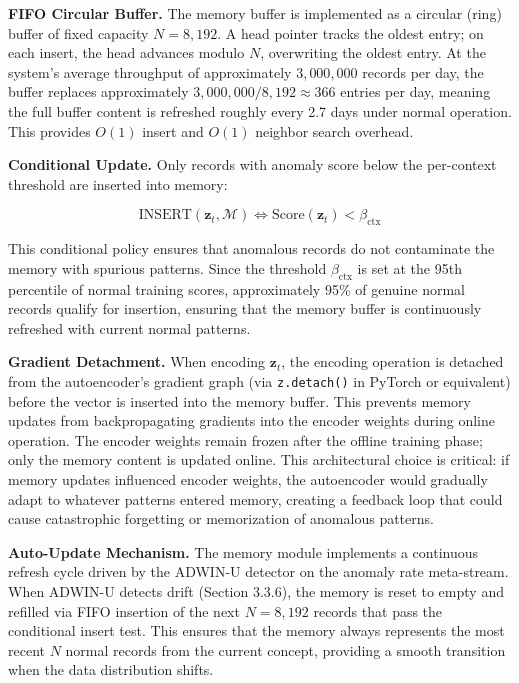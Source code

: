 \textbf{FIFO Circular Buffer.} The memory buffer is implemented as a circular (ring) buffer of fixed capacity $N = 8{,}192$. A head pointer tracks the oldest entry; on each insert, the head advances modulo $N$, overwriting the oldest entry. At the system's average throughput of approximately $3{,}000{,}000$ records per day, the buffer replaces approximately $3{,}000{,}000 / 8{,}192 \approx 366$ entries per day, meaning the full buffer content is refreshed roughly every 2.7 days under normal operation. This provides $O(1)$ insert and $O(1)$ neighbor search overhead.

\textbf{Conditional Update.} Only records with anomaly score below the per-context threshold are inserted into memory:

\begin{equation}
\text{INSERT}(\mathbf{z}_t, \mathcal{M}) \iff \text{Score}(\mathbf{z}_t) < \beta_{\text{ctx}}
\label{eq:conditional_insert}
\end{equation}

This conditional policy ensures that anomalous records do not contaminate the memory with spurious patterns. Since the threshold $\beta_{\text{ctx}}$ is set at the 95th percentile of normal training scores, approximately 95\% of genuine normal records qualify for insertion, ensuring that the memory buffer is continuously refreshed with current normal patterns.

\textbf{Gradient Detachment.} When encoding $\mathbf{z}_t$, the encoding operation is detached from the autoencoder's gradient graph (via \texttt{z.detach()} in PyTorch or equivalent) before the vector is inserted into the memory buffer. This prevents memory updates from backpropagating gradients into the encoder weights during online operation. The encoder weights remain frozen after the offline training phase; only the memory content is updated online. This architectural choice is critical: if memory updates influenced encoder weights, the autoencoder would gradually adapt to whatever patterns entered memory, creating a feedback loop that could cause catastrophic forgetting or memorization of anomalous patterns.

\textbf{Auto-Update Mechanism.} The memory module implements a continuous refresh cycle driven by the ADWIN-U detector on the anomaly rate meta-stream. When ADWIN-U detects drift (Section 3.3.6), the memory is reset to empty and refilled via FIFO insertion of the next $N = 8{,}192$ records that pass the conditional insert test. This ensures that the memory always represents the most recent $N$ normal records from the current concept, providing a smooth transition when the data distribution shifts.

